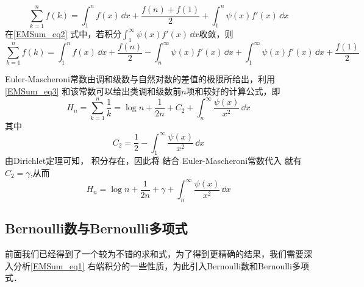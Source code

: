 \begin{equation}\label{EMSum_eq2}
    \sum_{k=1}^{n}f(k)
    =\int_{1}^{n}f(x)\,\dd x+\frac{f(n)+f(1)}{2}+\int_{1}^{n}\psi(x)f'(x)\,\dd x
\end{equation}
在\autoref{EMSum_eq2}  式中，若积分$\displaystyle{\int_{1}^{\infty}\psi(x)f'(x)\,\dd x}$收敛，则
\begin{equation}\label{EMSum_eq3}
    \sum_{k=1}^{n}f(k)=\int_{1}^{n}f(x)\,\dd x
    +\frac{f(n)}{2}-\int_{n}^{\infty}\psi(x)f'(x)\,\dd x
    +\int_{1}^{\infty}\psi(x)f'(x)\,\dd x+\frac{f(1)}{2}
\end{equation}
\begin{example}{}
Euler-Mascheroni常数由调和级数与自然对数的差值的极限所给出，利用\autoref{EMSum_eq3} 和该常数可以给出类调和级数前$n$项和较好的计算公式，即
\begin{equation}
    H_{n}=\sum_{k=1}^{n}\frac{1}{k}=\log n+\frac{1}{2n}+C_{2}
    +\int_{n}^{\infty}\frac{\psi(x)}{x^2}\,\dd x
\end{equation}
其中
\begin{equation}
    C_{2}=\frac{1}{2}-\int_{1}^{\infty}\frac{\psi(x)}{x^2}\,\dd x
\end{equation}
由Dirichlet定理可知， 积分存在，因此将 结合
Euler-Mascheroni常数代入 就有$C_{2}=\gamma$,从而
\begin{equation}
    H_{n}=\log n+\frac{1}{2n}+\gamma+\int_{n}^{\infty}\frac{\psi(x)}{x^2}\,\dd x
\end{equation}
\end{example}

\subsection{Bernoulli数与Bernoulli多项式}

前面我们已经得到了一个较为不错的求和式，为了得到更精确的结果，我们需要深入分析\autoref{EMSum_eq1} 右端积分的一些性质，为此引入Bernoulli数和Bernoulli多项式．


